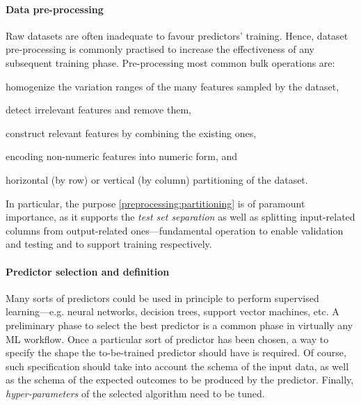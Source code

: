 \documentclass[runningheads]{llncs}
\begin{document}
\paragraph{Data pre-processing}
%
Raw datasets are often inadequate to favour predictors' training.
%
Hence, dataset pre-processing is commonly practised to increase the effectiveness of any subsequent training phase.
%
Pre-processing most common bulk operations are:
%
\begin{inlinelist}
    \item homogenize the variation ranges of the many features sampled by the dataset,
    \item detect irrelevant features and remove them,
    \item construct relevant features by combining the existing ones,
    \item encoding non-numeric features into numeric form, and
    \item\label{preprocessing:partitioning} horizontal (by row) or vertical (by column) partitioning of the dataset.
\end{inlinelist}
%
In particular, the purpose \ref{preprocessing:partitioning} is of paramount importance, as it supports the \emph{test set separation} as well as splitting input-related columns from output-related ones---fundamental operation to enable validation and testing and to support training respectively.

\paragraph{Predictor selection and definition}
%
Many sorts of predictors could be used in principle to perform supervised learning---e.g. neural networks, decision trees, support vector machines, etc.
%
A preliminary phase to select the best predictor is a common phase in virtually any ML workflow.
%
Once a particular sort of predictor has been chosen, a way to specify the shape the to-be-trained predictor should have is required.
%
Of course, such specification should take into account the schema of the input data, as well as the schema of the expected outcomes to be produced by the predictor.
%
Finally, \emph{hyper-parameters} of the selected algorithm need to be tuned.
%
\end{document}

